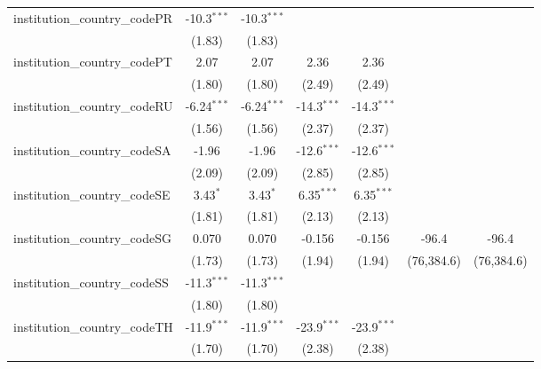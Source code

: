 \begin{tabular}{lcccccc}
   institution\_country\_codePR          & -10.3$^{***}$ & -10.3$^{***}$ &               &               &              &   \\   
                                         & (1.83)        & (1.83)        &               &               &              &   \\   
   institution\_country\_codePT          & 2.07          & 2.07          & 2.36          & 2.36          &              &   \\   
                                         & (1.80)        & (1.80)        & (2.49)        & (2.49)        &              &   \\   
   institution\_country\_codeRU          & -6.24$^{***}$ & -6.24$^{***}$ & -14.3$^{***}$ & -14.3$^{***}$ &              &   \\   
                                         & (1.56)        & (1.56)        & (2.37)        & (2.37)        &              &   \\   
   institution\_country\_codeSA          & -1.96         & -1.96         & -12.6$^{***}$ & -12.6$^{***}$ &              &   \\   
                                         & (2.09)        & (2.09)        & (2.85)        & (2.85)        &              &   \\   
   institution\_country\_codeSE          & 3.43$^{*}$    & 3.43$^{*}$    & 6.35$^{***}$  & 6.35$^{***}$  &              &   \\   
                                         & (1.81)        & (1.81)        & (2.13)        & (2.13)        &              &   \\   
   institution\_country\_codeSG          & 0.070         & 0.070         & -0.156        & -0.156        & -96.4        & -96.4\\   
                                         & (1.73)        & (1.73)        & (1.94)        & (1.94)        & (76,384.6)   & (76,384.6)\\   
   institution\_country\_codeSS          & -11.3$^{***}$ & -11.3$^{***}$ &               &               &              &   \\   
                                         & (1.80)        & (1.80)        &               &               &              &   \\   
   institution\_country\_codeTH          & -11.9$^{***}$ & -11.9$^{***}$ & -23.9$^{***}$ & -23.9$^{***}$ &              &   \\   
                                         & (1.70)        & (1.70)        & (2.38)        & (2.38)        &              &   \\   

\end{tabular}
